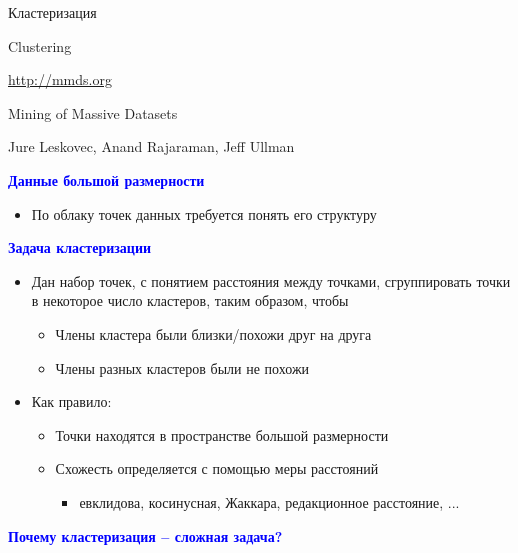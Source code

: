 \documentclass[landscape]{slides}
\begin{document}
\begin{normalsize} %


\begin{slide}
\begin{center}
Кластеризация

Clustering

\url{http://mmds.org}

Mining of Massive Datasets

Jure Leskovec, Anand Rajaraman, Jeff Ullman
\end{center}
\end{slide}


\begin{slide}
\textbf{\textcolor{blue}{Данные большой размерности}}

\begin{itemize}
\item По облаку точек данных требуется понять его структуру
\end{itemize}
\end{slide}



\begin{slide}
\textbf{\textcolor{blue}{Задача кластеризации}}

\begin{itemize}
\item Дан набор точек, с понятием расстояния между точками, сгруппировать точки в некоторое
число кластеров, таким образом, чтобы
  \begin{itemize}
  \item Члены кластера были близки/похожи друг на друга
  \item Члены разных кластеров были не похожи
  \end{itemize}
\item Как правило:
  \begin{itemize}
  \item Точки находятся в пространстве большой размерности
  \item Схожесть определяется с помощью меры расстояний
    \begin{itemize}
    \item евклидова, косинусная, Жаккара, редакционное расстояние, ...
    \end{itemize}
  \end{itemize}
\end{itemize}
\end{slide}



\begin{slide}
\textbf{\textcolor{blue}{Почему кластеризация -- сложная задача?}}


\end{slide}
\end{normalsize}
\end{document}
